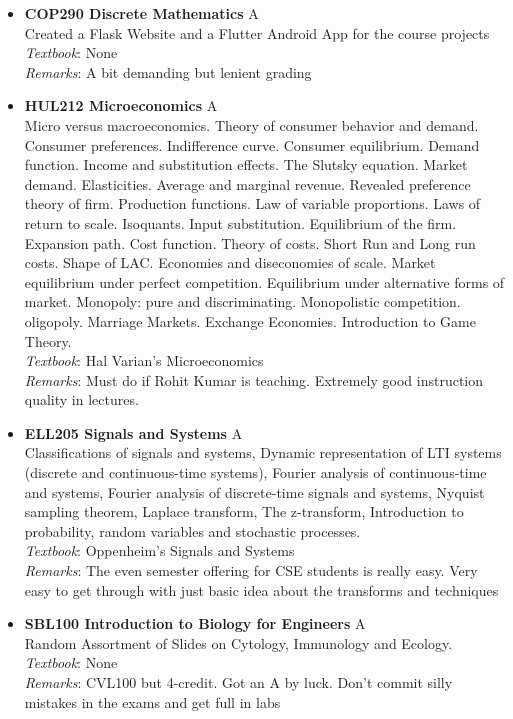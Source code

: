 \documentclass[a4paper]{article}
\begin{document}
\begin{itemize}
    \item \textbf{COP290 Discrete Mathematics} {\color{red}A}
    \\
    Created a Flask Website and a Flutter Android App for the course projects
    \\
    \textit{Textbook}: None
    \\
    \textit{Remarks}: A bit demanding but lenient grading
    \item \textbf{HUL212 Microeconomics} {\color{red}A}
    \\
    Micro versus macroeconomics. Theory of consumer behavior and demand. Consumer preferences. Indifference curve. Consumer equilibrium. Demand function. Income and substitution effects. The Slutsky equation. Market demand. Elasticities. Average and marginal revenue. Revealed preference theory of firm. Production functions. Law of variable proportions. Laws of return to scale. Isoquants. Input substitution. Equilibrium of the firm. Expansion path. Cost function. Theory of costs. Short Run and Long run costs. Shape of LAC. Economies and diseconomies of scale. Market equilibrium under perfect competition. Equilibrium under alternative forms of market. Monopoly: pure and discriminating. Monopolistic competition. oligopoly. Marriage Markets. Exchange Economies. Introduction to Game Theory.
     \\
    \textit{Textbook}: Hal Varian's Microeconomics
    \\
    \textit{Remarks}: Must do if Rohit Kumar is teaching. Extremely good instruction quality in lectures.
\item \textbf{ELL205 Signals and Systems} {\color{red}A}
    \\
    Classifications of signals and systems, Dynamic representation of LTI systems (discrete and continuous-time systems), Fourier analysis of continuous-time and systems, Fourier analysis of discrete-time signals and systems, Nyquist sampling theorem, Laplace transform, The z-transform, Introduction to probability, random variables and stochastic processes.
     \\
    \textit{Textbook}: Oppenheim's Signals and Systems
    \\
    \textit{Remarks}: The even semester offering for CSE students is really easy. Very easy to get through with just basic idea about the transforms and techniques
    \item \textbf{SBL100 Introduction to Biology for Engineers} {\color{red}A}
    \\
    Random Assortment of Slides on Cytology, Immunology and Ecology. 
     \\
    \textit{Textbook}: None
    \\
    \textit{Remarks}: CVL100 but 4-credit. Got an A by luck. Don't commit silly mistakes in the exams and get full in labs
    
\end{itemize}
\end{document}
